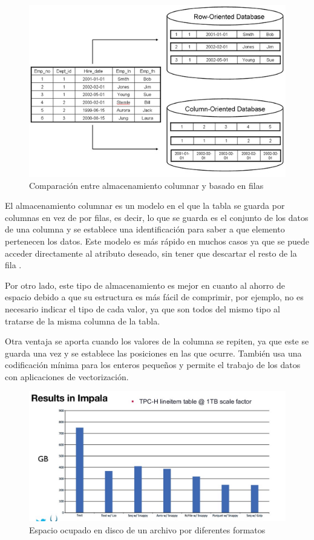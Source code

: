 \begin{figure}[htp!]
	\centering
	\caption{Comparación entre almacenamiento columnar y basado en filas \cite{column}}
	\label{column}
	\vspace{5pt}
	\includegraphics[scale=0.7]{graphics/column}
\end{figure}

El almacenamiento columnar es un modelo en el que la tabla se guarda por columnas en vez de por filas, es decir, lo que se guarda es el conjunto de los datos de una columna y se establece una identificación para saber a que elemento pertenecen los datos. Este modelo es más rápido en muchos casos ya que se puede acceder directamente al atributo deseado, sin tener que descartar el resto de la fila \cite{column}.

Por otro lado, este tipo de almacenamiento es mejor en cuanto al ahorro de espacio debido a que su estructura es más fácil de comprimir, por ejemplo, no es necesario indicar el tipo de cada valor, ya que son todos del mismo tipo al tratarse de la misma columna de la tabla. 

Otra ventaja se aporta cuando los valores de la columna se repiten, ya que este se guarda una vez y se establece las posiciones en las que ocurre. También usa una codificación mínima para los enteros pequeños y permite el trabajo de los datos con aplicaciones de vectorización.

\begin{figure}[htp!]
	\centering
	\caption{Espacio ocupado en disco de un archivo por diferentes formatos \cite{parquetSpace}}
	\label{parquetSpace}
	\vspace{5pt}
	\includegraphics[scale=0.2]{graphics/parquetSpace}
\end{figure}

